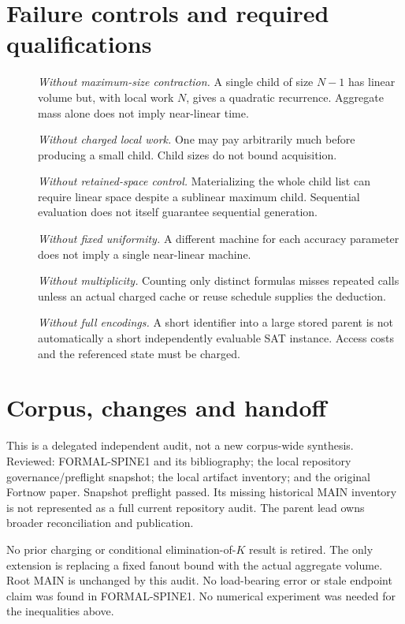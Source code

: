 \documentclass[11pt]{article}
\begin{document}
\section{Failure controls and required qualifications}
\begin{description}
\item[] \emph{Without maximum-size contraction.} A single child of size
$N-1$ has linear volume but, with local work $N$, gives a quadratic
recurrence. Aggregate mass alone does not imply near-linear time.
\item[] \emph{Without charged local work.} One may pay arbitrarily much
before producing a small child. Child sizes do not bound acquisition.
\item[] \emph{Without retained-space control.} Materializing the whole
child list can require linear space despite a sublinear maximum child.
Sequential evaluation does not itself guarantee sequential generation.
\item[] \emph{Without fixed uniformity.} A different machine for each
accuracy parameter does not imply a single near-linear machine.
\item[] \emph{Without multiplicity.} Counting only distinct formulas
misses repeated calls unless an actual charged cache or reuse schedule
supplies the deduction.
\item[] \emph{Without full encodings.} A short identifier into a large
stored parent is not automatically a short independently evaluable SAT
instance. Access costs and the referenced state must be charged.
\end{description}

\section{Corpus, changes and handoff}
This is a delegated independent audit, not a new corpus-wide synthesis.
Reviewed: FORMAL-SPINE1 and its bibliography; the local repository
governance/preflight snapshot; the local artifact inventory; and the
original Fortnow paper. Snapshot preflight passed. Its missing historical
MAIN inventory is not represented as a full current repository audit.
The parent lead owns broader reconciliation and publication.

No prior charging or conditional elimination-of-$K$ result is retired.
The only extension is replacing a fixed fanout bound with the actual
aggregate volume. Root MAIN is unchanged by this audit. No load-bearing
error or stale endpoint claim was found in FORMAL-SPINE1. No numerical
experiment was needed for the inequalities above.
\end{document}
